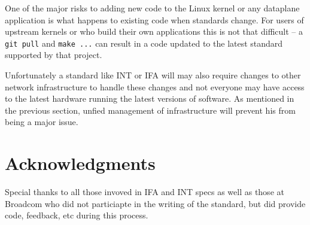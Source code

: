 \documentclass[letterpaper,twocolumn,10pt]{article}
\begin{document}
One of the major risks to adding new code to the Linux kernel or any
dataplane application is what happens to existing code when standards
change.  For users of upstream kernels or who build their own
applications this is not that difficult -- a \texttt{git pull} and
\texttt{make ...} can result in a code updated to the latest standard
supported by that project.

Unfortunately a standard like INT or IFA will may also require changes
to other network infrastructure to handle these changes and not everyone
may have access to the latest hardware running the latest versions of
software.  As mentioned in the previous section, unfied management of
infrastructure will prevent his from being a major issue.

\section{Acknowledgments}

Special thanks to all those invoved in IFA and INT specs as well as
those at Broadcom who did not particiapte in the writing of the
standard, but did provide code, feedback, etc during this process.

{\normalsize 
}

\theendnotes
\end{document}
